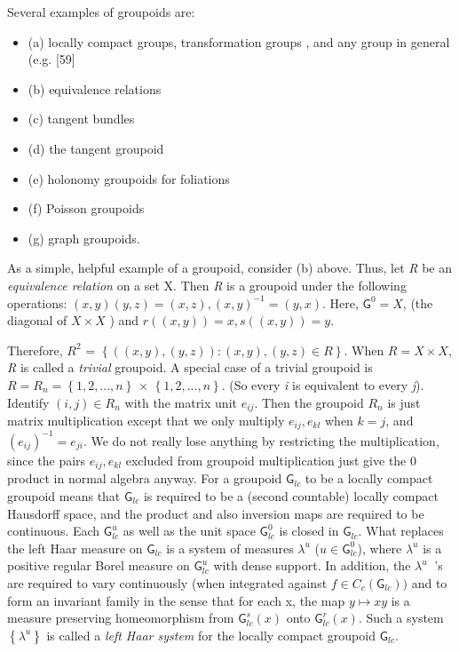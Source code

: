 \documentclass[12pt]{article}
\theoremstyle{plain}
\theoremstyle{definition}
\numberwithin{equation}{section}
\newcommand{\grp}{{\mathsf{G}}}
\newcommand{\<}{{\langle}}
\begin{document}
  Several examples of groupoids are:
\begin{itemize}
\item (a) locally compact groups,  transformation groups , and any group in general (e.g. [59]
\item (b) equivalence relations
\item (c) tangent bundles
\item (d) the tangent groupoid 
\item (e) holonomy groupoids for foliations 
\item (f) Poisson groupoids 
\item (g) graph groupoids.
\end{itemize}

 As a simple, helpful example of a groupoid, consider (b) above. Thus, let \textit{R} be an \textit{equivalence relation} on a set X. Then \textit{R} is a groupoid under the following operations:
$(x, y)(y, z) = (x, z), (x, y)^{-1} = (y, x)$. Here, $\grp^0 = X $, (the diagonal of $X \times X$ ) and $r((x, y)) = x,  s((x, y)) = y$.

 Therefore, $ R^2$ = $\left\{((x, y), (y, z)) : (x, y), (y, z) \in R \right\} $.
When $R = X \times X $,  \textit{R} is called a \textit{trivial} groupoid. A special case of a trivial groupoid is
$R = R_n = \left\{ 1, 2, . . . , n \right\}$  $\times $ $\left\{ 1, 2, . . . , n \right\} $. (So every \textit{i} is equivalent to every \textit{j}). Identify $(i,j) \in R_n$ with the matrix unit $e_{ij}$. Then the groupoid $R_n$ is just matrix multiplication except that we only multiply $e_{ij}, e_{kl}$ when $k = j$, and $(e_{ij} )^{-1} = e_{ji}$. We do not really lose anything by restricting the multiplication, since the pairs $e_{ij}, {e_{kl}}$ excluded from groupoid multiplication just give the 0 product in normal algebra anyway.
For a groupoid $\grp_{lc}$ to be a locally compact groupoid means that $\grp_{lc}$ is required to be a (second countable) locally compact Hausdorff space, and the product and also inversion maps are required to be continuous. Each $\grp_{lc}^u$ as well as the unit space $\grp_{lc}^0$ is closed in $\grp_{lc}$. What replaces the left Haar measure on $\grp_{lc}$ is a system of measures $\lambda^u$ ($u \in \grp_{lc}^0$), where $\lambda^u$ is a positive regular Borel measure on $\grp_{lc}^u$ with dense support. In addition, the $\lambda^u~$ 's are required to vary continuously (when integrated against $f \in C_c(\grp_{lc}))$ and to form an invariant family in the sense that for each x, the map $y \mapsto xy$ is a measure preserving homeomorphism from $\grp_{lc}^s(x)$ onto $\grp_{lc}^r(x)$. Such a system $\left\{ \lambda^u \right\}$ is called a \textit{left Haar system} for the locally compact groupoid $\grp_{lc}$.
\end{document}
